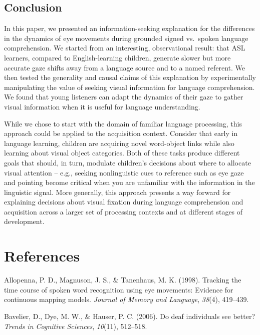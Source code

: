 \documentclass[,man,floatsintext]{apa6}
\begin{document}
\subsection{Conclusion}\label{conclusion}

In this paper, we presented an information-seeking explanation for the
differences in the dynamics of eye movements during grounded signed
vs.~spoken language comprehension. We started from an interesting,
observational result: that ASL learners, compared to English-learning
children, generate slower but more accurate gaze shifts away from a
language source and to a named referent. We then tested the generality
and causal claims of this explanation by experimentally manipulating the
value of seeking visual information for language comprehension. We found
that young listeners can adapt the dynamics of their gaze to gather
visual information when it is useful for language understanding.

While we chose to start with the domain of familiar language processing,
this approach could be applied to the acquisition context. Consider that
early in language learning, children are acquiring novel word-object
links while also learning about visual object categories. Both of these
tasks produce different goals that should, in turn, modulate children's
decisions about where to allocate visual attention -- e.g., seeking
nonlinguistic cues to reference such as eye gaze and pointing become
critical when you are unfamiliar with the information in the linguistic
signal. More generally, this approach presents a way forward for
explaining decisions about visual fixation during language comprehension
and acquisition across a larger set of processing contexts and at
different stages of development.

\section{References}\label{references}

\setlength{\parindent}{-0.5in} \setlength{\leftskip}{0.5in}

\hypertarget{refs}{}
\hypertarget{ref-allopenna1998tracking}{}
Allopenna, P. D., Magnuson, J. S., \& Tanenhaus, M. K. (1998). Tracking
the time course of spoken word recognition using eye movements: Evidence
for continuous mapping models. \emph{Journal of Memory and Language},
\emph{38}(4), 419--439.

\hypertarget{ref-bavelier2006deaf}{}
Bavelier, D., Dye, M. W., \& Hauser, P. C. (2006). Do deaf individuals
see better? \emph{Trends in Cognitive Sciences}, \emph{10}(11),
512--518.
\end{document}
